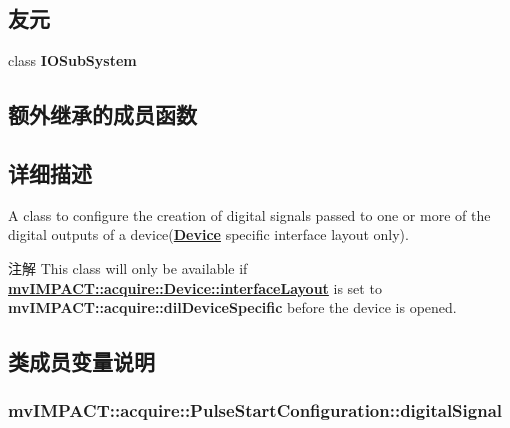 \subsection*{友元}
\begin{DoxyCompactItemize}
\item 
\hypertarget{classmv_i_m_p_a_c_t_1_1acquire_1_1_pulse_start_configuration_a3a1008d5502332da6f64a8940aa3a007}{class {\bfseries I\+O\+Sub\+System}}\label{classmv_i_m_p_a_c_t_1_1acquire_1_1_pulse_start_configuration_a3a1008d5502332da6f64a8940aa3a007}

\end{DoxyCompactItemize}
\subsection*{额外继承的成员函数}


\subsection{详细描述}
A class to configure the creation of digital signals passed to one or more of the digital outputs of a device({\bfseries \hyperlink{classmv_i_m_p_a_c_t_1_1acquire_1_1_device}{Device}} specific interface layout only). 

\begin{DoxyNote}{注解}
This class will only be available if {\bfseries \hyperlink{classmv_i_m_p_a_c_t_1_1acquire_1_1_device_ab4dd0ecc9d456bb5ddc01d844c9d6f2d}{mv\+I\+M\+P\+A\+C\+T\+::acquire\+::\+Device\+::interface\+Layout}} is set to {\bfseries mv\+I\+M\+P\+A\+C\+T\+::acquire\+::dil\+Device\+Specific} before the device is opened. 
\end{DoxyNote}


\subsection{类成员变量说明}
\hypertarget{classmv_i_m_p_a_c_t_1_1acquire_1_1_pulse_start_configuration_a5cf89b1d644e0ba87fa1a254f7d2a0df}{
\subsubsection[{digital\+Signal}]{ mv\+I\+M\+P\+A\+C\+T\+::acquire\+::\+Pulse\+Start\+Configuration\+::digital\+Signal}}\label{classmv_i_m_p_a_c_t_1_1acquire_1_1_pulse_start_configuration_a5cf89b1d644e0ba87fa1a254f7d2a0df}


